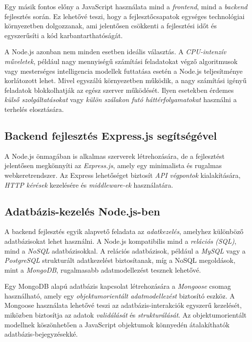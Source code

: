 \documentclass[
]{thesis-ekf}
\theoremstyle{definition}
\theoremstyle{remark}
\begin{document}
Egy másik fontos előny a JavaScript használata mind a \emph{frontend}, mind a \emph{backend} fejlesztés során. Ez lehetővé teszi, hogy a fejlesztőcsapatok egységes technológiai környezetben dolgozzanak, ami jelentősen csökkenti a fejlesztési időt és egyszerűsíti a kód karbantarthatóságát.

A Node.js azonban nem minden esetben ideális választás. A \emph{CPU-intenzív műveletek}, például nagy mennyiségű számítási feladatokat végző algoritmusok vagy mesterséges intelligencia modellek futtatása esetén a Node.js teljesítménye korlátozott lehet. Mivel egyszálú környezetben működik, a nagy számítási igényű feladatok blokkolhatják az egész szerver működését. Ilyen esetekben érdemes \emph{külső szolgáltatásokat} vagy \emph{külön szálakon futó háttérfolyamatokat} használni a terhelés elosztására.

\subsection{Backend fejlesztés Express.js segítségével}
A Node.js önmagában is alkalmas szerverek létrehozására, de a fejlesztést jelentősen megkönnyíti az \emph{Express.js}, amely egy minimalista és rugalmas webkeretrendszer. Az Express lehetőséget biztosít \emph{API végpontok} kialakítására, \emph{HTTP kérések} kezelésére és \emph{middleware-ek} használatára. \cite{nodeInAction, holmesExpress}

\subsection{Adatbázis-kezelés Node.js-ben}
A backend fejlesztés egyik alapvető feladata az \emph{adatkezelés}, amelyhez különböző adatbázisokat lehet használni. A Node.js kompatibilis mind a \emph{relációs (SQL)}, mind a \emph{NoSQL} adatbázisokkal. A relációs adatbázisok, például a \emph{MySQL} vagy a \emph{PostgreSQL} strukturált adatkezelést biztosítanak, míg a NoSQL megoldások, mint a \emph{MongoDB}, rugalmasabb adatmodellezést tesznek lehetővé.

Egy MongoDB alapú adatbázis kapcsolat létrehozására a \emph{Mongoose} csomag használható, amely egy \emph{objektumorientált adatmodellezést} biztosító eszköz. A Mongoose használata lehetővé teszi az adatbázis-interakciók egyszerű kezelését, miközben biztosítja az adatok \emph{validálását} és \emph{strukturálását}. Az objektumorientált modellnek köszönhetően a JavaScript objektumok könnyedén átalakíthatók adatbázis-bejegyzésekké. \cite{mongooseDocs}
\end{document}
